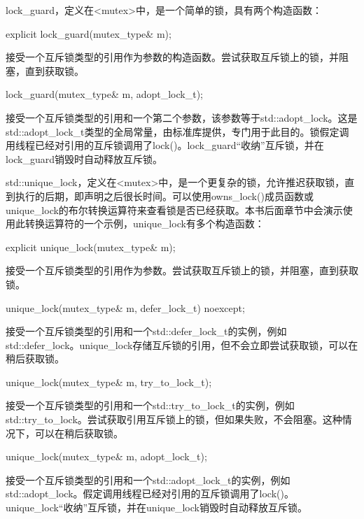 
lock\_guard，定义在<mutex>中，是一个简单的锁，具有两个构造函数：

\begin{cpp}
explicit lock_guard(mutex_type& m);
\end{cpp}

接受一个互斥锁类型的引用作为参数的构造函数。尝试获取互斥锁上的锁，并阻塞，直到获取锁。

\begin{cpp}
lock_guard(mutex_type& m, adopt_lock_t);
\end{cpp}

接受一个互斥锁类型的引用和一个第二个参数，该参数等于std::adopt\_lock。这是std::adopt\_lock\_t类型的全局常量，由标准库提供，专门用于此目的。锁假定调用线程已经对引用的互斥锁调用了lock()。lock\_guard“收纳”互斥锁，并在lock\_guard销毁时自动释放互斥锁。


std::unique\_lock，定义在<mutex>中，是一个更复杂的锁，允许推迟获取锁，直到执行的后期，即声明之后很长时间。可以使用owns\_lock()成员函数或unique\_lock的布尔转换运算符来查看锁是否已经获取。本书后面章节中会演示使用此转换运算符的一个示例，unique\_lock有多个构造函数：

\begin{cpp}
explicit unique_lock(mutex_type& m);
\end{cpp}

接受一个互斥锁类型的引用作为参数。尝试获取互斥锁上的锁，并阻塞，直到获取锁。

\begin{cpp}
unique_lock(mutex_type& m, defer_lock_t) noexcept;
\end{cpp}

接受一个互斥锁类型的引用和一个std::defer\_lock\_t的实例，例如std::defer\_lock。unique\_lock存储互斥锁的引用，但不会立即尝试获取锁，可以在稍后获取锁。

\begin{cpp}
unique_lock(mutex_type& m, try_to_lock_t);
\end{cpp}

接受一个互斥锁类型的引用和一个std::try\_to\_lock\_t的实例，例如std::try\_to\_lock。尝试获取引用互斥锁上的锁，但如果失败，不会阻塞。这种情况下，可以在稍后获取锁。

\begin{cpp}
unique_lock(mutex_type& m, adopt_lock_t);
\end{cpp}

接受一个互斥锁类型的引用和一个std::adopt\_lock\_t的实例，例如std::adopt\_lock。假定调用线程已经对引用的互斥锁调用了lock()。unique\_lock“收纳”互斥锁，并在unique\_lock销毁时自动释放互斥锁。

